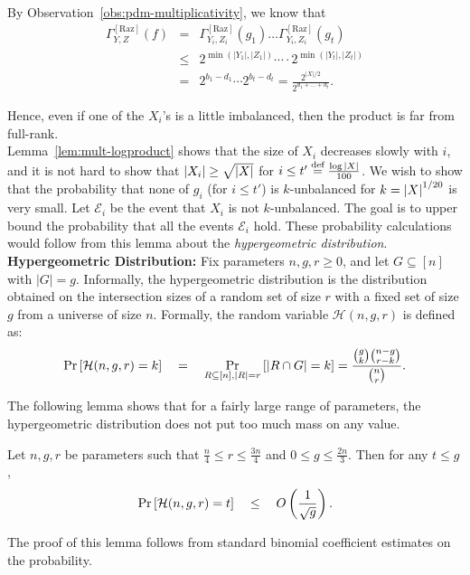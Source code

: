 \documentclass[12pt]{report}
\newcommand{\CM}[1]{\Gamma^{\mathrm{[#1]}}}
\begin{document}
By Observation~\ref{obs:pdm-multiplicativity}, we know that 
\begin{eqnarray*}
\CM{Raz}_{Y,Z}(f) & = & \CM{Raz}_{Y_i,Z_i}(g_1) \dots \CM{Raz}_{Y_i,Z_i}(g_t)\\
 & \leq & 2^{\min(|Y_1|,|Z_1|)} \cdots  \cdot 2^{\min(|Y_t|,|Z_t|)}\\ 
 & = & 2^{b_1  - d_1} \cdots 2^{b_t - d_t} = \frac{2^{|X|/2}}{2^{d_1 + \dots + d_t}}.
\end{eqnarray*}

Hence, even if one of the $X_i$'s is a little imbalanced, then the product is far from full-rank. \\

Lemma~\ref{lem:mult-logproduct} shows that the size of $X_i$ decreases slowly with $i$, and it is not hard to show that $\left|X_i\right| \geq \sqrt{\left|X\right|}$ for $i \leq t'\stackrel{\text{def}}{=}\frac{\log{\left|X\right|}}{100}$. We wish to show that the probability that none of $g_i$ (for $i\leq t'$) is $k$-unbalanced for $k = \left|X\right|^{1/20}$ is very small. Let $\mathcal{E}_i$ be the event that $X_i$ is not $k$-unbalanced. The goal is to upper bound the probability that all the events $\mathcal{E}_i$ hold. These probability calculations would follow from this lemma about the \emph{hypergeometric distribution}.\\

{\bf Hypergeometric Distribution: } Fix parameters $n, g, r \geq 0$, and let $G \subseteq [n]$ with $|G| = g$. Informally, the hypergeometric distribution is the distribution obtained on the intersection sizes of a random set of size $r$ with a fixed set of size $g$ from a universe of size $n$. 
Formally, the random variable $\mathcal{H}(n,g,r)$ is defined as:
$$
\Pr\left[\mathcal{H}(n,g,r) = k\right] \quad = \quad \Pr_{R\subseteq [n],|R| = r}\left[\left|R \cap G\right| = k\right] = \frac{\binom{g}{k}\binom{n-g}{r-k}}{\binom{n}{r}}.
$$


The following lemma shows that for a fairly large range of parameters, the hypergeometric distribution does not put too much mass on any value.

\begin{lemma}\label{lem:hypergeom_low-weight}
  Let $n,g,r$ be parameters such that $\frac{n}{4} \leq r \leq \frac{3n}{4}$ and $0\leq g\leq \frac{2n}{3}$. Then for any $t\leq g$,
  $$
  \Pr\left[\mathcal{H}(n,g,r) = t\right] \quad \leq \quad O\left(\frac{1}{\sqrt{g}}\right).
  $$
\end{lemma}
The proof of this lemma follows from standard binomial coefficient estimates on the probability.\\
\end{document}
